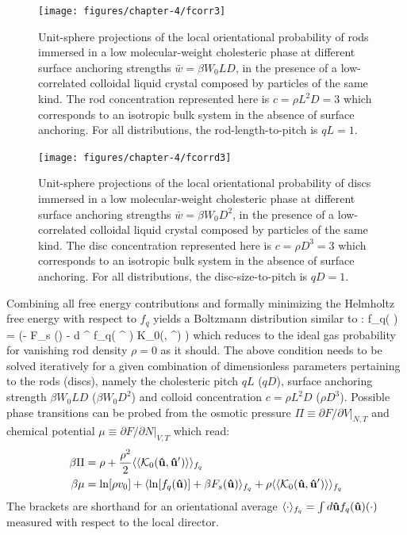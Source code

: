 \begin{figure}
	\texttt{[image: figures/chapter-4/fcorr3]}
	\caption[Unit-sphere projections of a rod in the presence of a low-correlated colloidal liquid crystal]{ Unit-sphere projections of the local orientational probability of rods immersed in a low molecular-weight cholesteric phase at different surface anchoring strengths $\bar{w} = \beta W_{0}LD$, in the presence of a low-correlated colloidal liquid crystal composed by particles of the same kind.  The rod concentration represented here is  $c= \rho L^{2} D = 3$ which corresponds to an isotropic bulk system in the absence of surface anchoring. For all distributions, the rod-length-to-pitch is $qL=1$.}
	\label{fcorr3}
\end{figure}

   \begin{figure}
	\texttt{[image: figures/chapter-4/fcorrd3]}
	\caption[Unit-sphere projections of a disc in the presence of a low-correlated colloidal liquid crystal]{ Unit-sphere projections of the local orientational probability of discs immersed in a low molecular-weight cholesteric phase at different surface anchoring strengths $\bar{w} = \beta W_{0}D^2$, in the presence of a low-correlated colloidal liquid crystal composed by particles of the same kind.  The disc concentration represented here is  $c= \rho D^3 = 3$ which corresponds to an isotropic bulk system in the absence of surface anchoring. For all distributions, the disc-size-to-pitch is $qD=1$.}
	\label{fcorrd3}
\end{figure}
Combining all free energy contributions and formally minimizing the Helmholtz free energy with respect to $f_{q}$ yields a Boltzmann distribution similar to :
   \beq
  f_{q}( \bhu ) =  \exp \left (- \beta  F_{s} (\bhu) - \rho \int d \bhu^{\prime} f_{q}( \bhu^{\prime} ) {\mathcal K}_{0}(\bhu, \bhu^{\prime})  \right )
  \label{fcollec}
  \eeq
  which reduces to the ideal gas probability  for vanishing rod density $\rho = 0$ as it should. The above condition needs to be solved iteratively for a given combination of dimensionless parameters pertaining to the rods (discs), namely the  cholesteric pitch $qL$ ($qD$), surface anchoring strength $\beta W_{0}LD$ ($\beta W_{0}D^{2}$) and colloid concentration $c = \rho L^{2}D$ ($\rho D^{3}$). Possible phase transitions can be probed from the osmotic pressure $\Pi \equiv \partial F/\partial V|_{N,T}$ and chemical potential $\mu \equiv \partial F /\partial N|_{V,T}$ which read:
  \begin{align}
  \beta \Pi  &= \rho + \frac{\rho^{2}}{2} \langle \langle {\mathcal K}_{0}({\bf \hat{u}}, {\bf \hat{u}}^{\prime}) \rangle \rangle _{f_{q}} \nonumber \\
  \beta \mu &= \ln [\rho v_{0}] + \langle \ln [f_{q} ({\bf \hat{u}})] + \beta F_{s}({\bf \hat{u}})\rangle_{f_{q}} + \rho \langle \langle {\mathcal K}_{0}({\bf \hat{u}}, {\bf \hat{u}}^{\prime}) \rangle \rangle_{f_{q}}
  \end{align}
  The  brackets are shorthand for an orientational average $ \langle  \cdot  \rangle_{f_{q}} = \int d {\bf \hat{u}}   f_{q}({\bf \hat{u}} )(\cdot)$ measured with respect to the local director.


